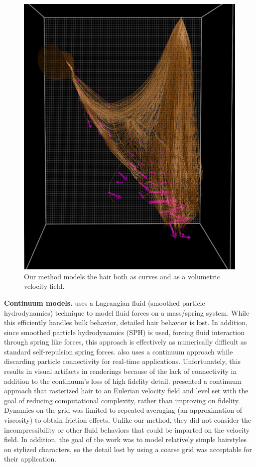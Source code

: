 \begin{figure}[t!]
  \centering
\includegraphics[width = .4\columnwidth]{hair/images/viz/together-15}
  \caption[Hair as curves and continuum.]{\label{fig:viz} Our method models the hair both as curves
    and as a volumetric velocity field.}
\end{figure}

\noindent\textbf{Continuum models.}  \cite{hadap:2001:continuum-hair} uses a Lagrangian
fluid (smoothed particle hydrodynamics) technique to model fluid forces on a
mass/spring system. While this efficiently handles bulk behavior, detailed hair
behavior is lost. In addition, since smoothed particle hydrodynamics (SPH) is
used, forcing fluid interaction through spring like forces, this approach is
effectively as numerically difficult as standard self-repulsion spring forces.
\cite{bando:2003:hair-loosely-connected-particles} also uses a continuum
approach while discarding particle connectivity for real-time
applications. Unfortunately, this results in visual artifacts in renderings
because of the lack of connectivity in addition to the continuum's loss of high
fidelity detail.  \cite{petrovic:2005:levelset-hair} presented a continuum
approach that rasterized hair to an Eulerian velocity field and level set with
the goal of reducing computational complexity, rather than improving on
fidelity. Dynamics on the grid was limited to repeated averaging (an
approximation of viscosity) to obtain friction effects. Unlike our method,
they did not consider the incompressibility or other fluid behaviors that could
be imparted on the velocity field. In addition, the goal of the work was to
model relatively simple hairstyles on stylized characters, so the detail lost by
using a coarse grid was acceptable for their application.

